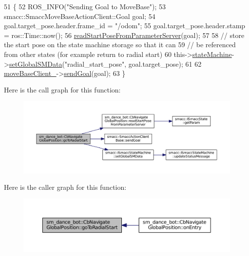 \begin{DoxyCode}
51   \{
52     ROS\_INFO(\textcolor{stringliteral}{"Sending Goal to MoveBase"});
53     smacc::SmaccMoveBaseActionClient::Goal goal;
54     goal.target\_pose.header.frame\_id = \textcolor{stringliteral}{"/odom"};
55     goal.target\_pose.header.stamp = ros::Time::now();
56     \hyperlink{classsm__dance__bot_1_1CbNavigateGlobalPosition_aa081de6b798e53e4fd0a4b86e55635b5}{readStartPoseFromParameterServer}(goal);
57 
58     \textcolor{comment}{// store the start pose on the state machine storage so that it can}
59     \textcolor{comment}{// be referenced from other states (for example return to radial start)}
60     this->\hyperlink{classsmacc_1_1SmaccClientBehavior_aa1c28c177d50a471c88c6a577cd6077e}{stateMachine}->\hyperlink{classsmacc_1_1ISmaccStateMachine_a8588f9e580fbb95b53e2bd2ca3ff1f98}{setGlobalSMData}(\textcolor{stringliteral}{"radial\_start\_pose"}, goal.target\_pose);
61 
62     \hyperlink{classsm__dance__bot_1_1CbNavigateGlobalPosition_acaea61e5bdf69018d945f6c7025acfc0}{moveBaseClient\_}->\hyperlink{classsmacc_1_1SmaccActionClientBase_a58c67a87c5fb8ea1633573c58fe3eee1}{sendGoal}(goal);
63   \}
\end{DoxyCode}


Here is the call graph for this function\+:
\nopagebreak
\begin{figure}[H]
\begin{center}
\leavevmode
\includegraphics[width=350pt]{classsm__dance__bot_1_1CbNavigateGlobalPosition_a0832f7a7f205cc483be012aef9501312_cgraph}
\end{center}
\end{figure}




Here is the caller graph for this function\+:
\nopagebreak
\begin{figure}[H]
\begin{center}
\leavevmode
\includegraphics[width=350pt]{classsm__dance__bot_1_1CbNavigateGlobalPosition_a0832f7a7f205cc483be012aef9501312_icgraph}
\end{center}
\end{figure}


